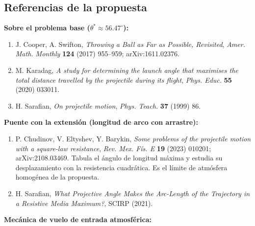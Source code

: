 \subsection{Referencias de la propuesta}
\label{sec:refs-ext}

\textbf{Sobre el problema base (\(\theta^*\approx56.47^\circ\)):}

\begin{enumerate}[label=(\arabic*)]
    \item J. Cooper, A. Swifton, \textit{Throwing a Ball as Far as Possible, Revisited}, \textit{Amer. Math. Monthly} \textbf{124} (2017) 955--959; arXiv:1611.02376.
    \item M. Karadag, \textit{A study for determining the launch angle that maximises the total distance travelled by the projectile during its flight}, \textit{Phys. Educ.} \textbf{55} (2020) 033011.
    \item H. Sarafian, \textit{On projectile motion}, \textit{Phys. Teach.} \textbf{37} (1999) 86.
\end{enumerate}

\textbf{Puente con la extensión (longitud de arco con arrastre):}

\begin{enumerate}[label=(\arabic*),start=4]
    \item P. Chudinov, V. Eltyshev, Y. Barykin, \textit{Some problems of the projectile motion with a square-law resistance}, \textit{Rev. Mex. Fís. E} \textbf{19} (2023) 010201; arXiv:2108.03469. Tabula el ángulo de longitud máxima y estudia su desplazamiento con la resistencia cuadrática. Es el límite de atmósfera homogénea de la propuesta.
    \item H. Sarafian, \textit{What Projective Angle Makes the Arc-Length of the Trajectory in a Resistive Media Maximum?}, SCIRP (2021).
\end{enumerate}

\textbf{Mecánica de vuelo de entrada atmosférica:}


